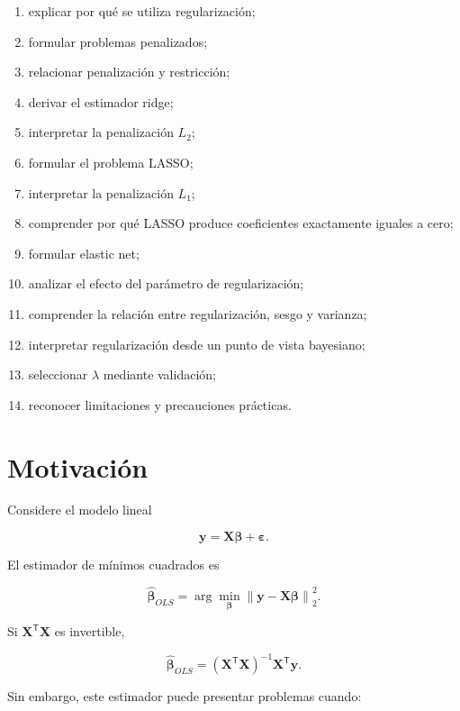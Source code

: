 \documentclass[
  spanish,
  10.5pt,
  letterpaper,
  DIV=11,
  numbers=noendperiod,
  oneside,
  open=any]{scrreprt}
\providecommand{\tightlist}{%
  \setlength{\itemsep}{0pt}\setlength{\parskip}{0pt}}
\theoremstyle{definition}
\theoremstyle{definition}
\theoremstyle{plain}
\theoremstyle{remark}
\begin{document}
\begin{enumerate}
\def\labelenumi{\arabic{enumi}.}
\tightlist
\item
  explicar por qué se utiliza regularización;
\item
  formular problemas penalizados;
\item
  relacionar penalización y restricción;
\item
  derivar el estimador ridge;
\item
  interpretar la penalización \(L_2\);
\item
  formular el problema LASSO;
\item
  interpretar la penalización \(L_1\);
\item
  comprender por qué LASSO produce coeficientes exactamente iguales a
  cero;
\item
  formular elastic net;
\item
  analizar el efecto del parámetro de regularización;
\item
  comprender la relación entre regularización, sesgo y varianza;
\item
  interpretar regularización desde un punto de vista bayesiano;
\item
  seleccionar \(\lambda\) mediante validación;
\item
  reconocer limitaciones y precauciones prácticas.
\end{enumerate}

\section*{Motivación}\label{motivaciuxf3n}


Considere el modelo lineal

\[
\mathbf{y}
=
\mathbf{X}\boldsymbol{\beta}
+
\boldsymbol{\varepsilon}.
\]

El estimador de mínimos cuadrados es

\[
\widehat{\boldsymbol{\beta}}_{OLS}
=
\arg\min_{\boldsymbol{\beta}}
\left\|
\mathbf{y}
-
\mathbf{X}\boldsymbol{\beta}
\right\|_2^2.
\]

Si \(\mathbf{X}^{\mathsf T}\mathbf{X}\) es invertible,

\[
\widehat{\boldsymbol{\beta}}_{OLS}
=
\left(
\mathbf{X}^{\mathsf T}\mathbf{X}
\right)^{-1}
\mathbf{X}^{\mathsf T}\mathbf{y}.
\]

Sin embargo, este estimador puede presentar problemas cuando:
\end{document}
